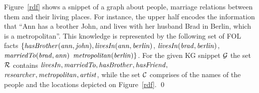 \begin{example} Figure~\ref{rdf} shows a snippet of a graph about people, marriage %
relations between them %
and  their %
living places. For instance, the upper half encodes the information that ``Ann has a brother John, and lives with her husband Brad in Berlin, which is a metropolitan''. 
This knowledge is %
represented by the following set of FOL facts $\mathit{\{hasBrother(ann, john), livesIn(ann, berlin)}$, $\mathit{livesIn(brad, berlin)}$, $\mathit{marriedTo(brad, ann)}$
$\mathit{metropolitan(berlin)}\}$. For the given KG snippet $\mathcal{G}$ the set $\mathcal{R}$ contains $\mathit{livesIn,marriedTo,hasBrother,hasFriend,}$\\$\mathit{researcher,metropolitan,artist}$, while the set $\mathcal{C}$ comprises of the names of the people and the locations depicted on Figure~\ref{rdf}. \qed
\end{example}






